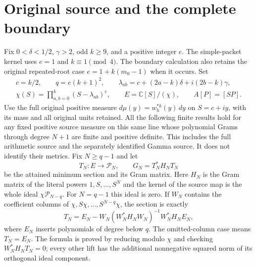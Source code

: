 \documentclass[11pt]{article}
\providecommand{\C}{\mathbb C}\providecommand{\R}{\mathbb R}
\begin{document}
\section{Original source and the complete boundary}
Fix $0<\delta<1/2$, $\gamma>2$, odd $k\ge9$, and a positive integer
$e$. The simple-packet kernel uses $e=1$ and $k\equiv1\pmod4$.
The boundary calculation also retains the original repeated-root
case $e=1+k(m_0-1)$ when it occurs. Set
\begin{equation}\tag{NE1}
\begin{gathered}
c=k/2,\qquad q=e(k+1)^2,\qquad
\lambda_{ab}=c+(2a-k)\delta+i(2b-k)\gamma,\\
\chi(S)=\prod_{a,b=0}^k(S-\lambda_{ab})^e,\qquad
E=\C[S]/(\chi),\qquad A[P]=[SP].
\end{gathered}
\end{equation}
Use the full original positive measure $d\mu(y)=w_h^{*k}(y)\,dy$
on $S=c+iy$, with its mass and all original units retained.
All the following finite results hold for any fixed positive source
measure on this same line whose polynomial Grams through degree $N+1$
are finite and positive definite. This includes the full arithmetic
source and the separately identified Gamma source. It does not identify
their metrics. Fix $N\ge q-1$ and let
\[
T_N:E\longrightarrow\mathcal P_N,
\qquad G_N=T_N^*H_NT_N
\]
be the attained minimum section and its Gram matrix. Here $H_N$ is the
Gram matrix of the literal powers $1,S,\ldots,S^N$ and the kernel of
the source map is the whole ideal $\chi\mathcal P_{N-q}$.
For $N=q-1$ this ideal is zero. If $W_N$ contains the coefficient
columns of $\chi,S\chi,\ldots,S^{N-q}\chi$, the section is exactly
\[
T_N=E_N-W_N(W_N^*H_NW_N)^{-1}W_N^*H_NE_N,
\]
where $E_N$ inserts polynomials of degree below $q$. The omitted-column
case means $T_N=E_N$. The formula is proved by reducing modulo $\chi$
and checking $W_N^*H_NT_N=0$; every other lift has the additional
nonnegative squared norm of its orthogonal ideal component.
\end{document}
